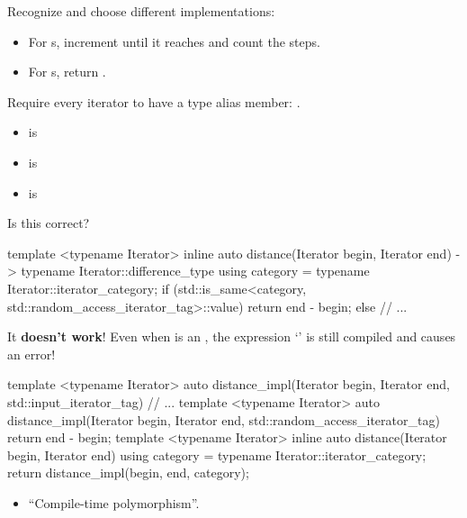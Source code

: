 \begin{frame}[fragile]{}
    Recognize and choose different implementations:
    \begin{itemize}
        \item For s, increment  until it reaches  and count the steps.
        \item For s, return .
    \end{itemize}
    \pause
    Require every iterator to have a type alias member: .
    \begin{itemize}
        \item {} is 
        \item {} is 
        \item {} is 
    \end{itemize}
\end{frame}

\begin{frame}[fragile]{}
    Is this correct?
    \begin{cpp}
template <typename Iterator>
inline auto distance(Iterator begin, Iterator end)
    -> typename Iterator::difference_type {
  using category = typename Iterator::iterator_category;
  if (std::is_same<category,
                std::random_access_iterator_tag>::value)
    return end - begin;
  else {
    // ...
  }
}
    \end{cpp}
    \pause
    It \textbf{doesn't work}! Even when  is an , the expression `' is still compiled and causes an error!
\end{frame}

\begin{frame}[fragile]{}
    \begin{cpp}
template <typename Iterator>
auto distance_impl(Iterator begin, Iterator end,
                   std::input_iterator_tag) {
  // ...
}
template <typename Iterator>
auto distance_impl(Iterator begin, Iterator end,
                   std::random_access_iterator_tag) {
  return end - begin;
}
template <typename Iterator>
inline auto distance(Iterator begin, Iterator end) {
  using category = typename Iterator::iterator_category;
  return distance_impl(begin, end, category{});
}
    \end{cpp}
    \begin{itemize}
        \item ``Compile-time polymorphism''.
    \end{itemize}
\end{frame}

